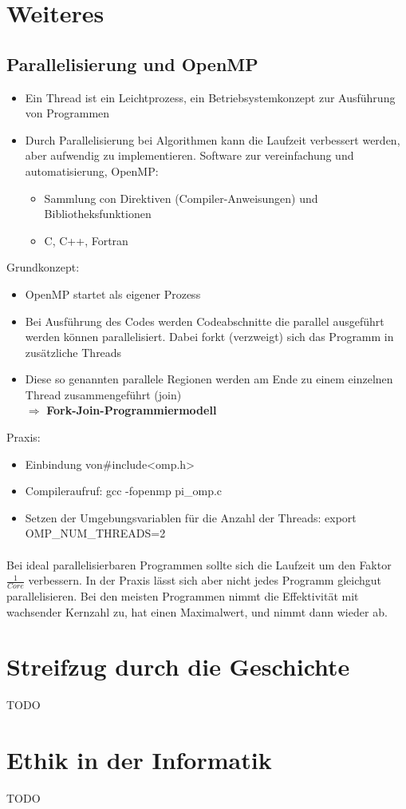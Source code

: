 \newpage
\section{Weiteres}
	\subsection{Parallelisierung und OpenMP}
		\begin{itemize}
			\item Ein Thread ist ein Leichtprozess, ein Betriebsystemkonzept zur Ausführung von Programmen
			\item Durch Parallelisierung bei Algorithmen kann die Laufzeit verbessert werden,
				aber aufwendig zu implementieren. Software zur vereinfachung und automatisierung, OpenMP:
			\begin{itemize}
				\item Sammlung con Direktiven (Compiler-Anweisungen) und Bibliotheksfunktionen
				\item C, C++, Fortran \\
			\end{itemize}
		\end{itemize} 

		Grundkonzept:
		\begin{itemize}
			\item OpenMP startet als eigener Prozess
			\item Bei Ausführung des Codes werden Codeabschnitte die parallel ausgeführt werden können
				parallelisiert. Dabei forkt (verzweigt) sich das Programm in zusätzliche Threads
			\item Diese so genannten parallele Regionen werden am Ende zu einem einzelnen Thread
				zusammengeführt (join) \\
				$\Longrightarrow$ \textbf{Fork-Join-Programmiermodell} \\
		\end{itemize}

		Praxis:
		\begin{itemize}
			\item Einbindung von\#include<omp.h>
			\item Compileraufruf: gcc -fopenmp pi\_omp.c
			\item Setzen der Umgebungsvariablen für die Anzahl der Threads: export OMP\_NUM\_THREADS=2
		\end{itemize}

		\paragraph{} Bei ideal parallelisierbaren Programmen sollte sich die Laufzeit um den Faktor
		$\frac{1}{Core}$ verbessern. In der Praxis lässt sich aber nicht jedes Programm gleichgut 
		parallelisieren. Bei den meisten Programmen nimmt die Effektivität mit wachsender Kernzahl
		zu, hat einen Maximalwert, und nimmt dann wieder ab.



\newpage
\section{Streifzug durch die Geschichte}
TODO

\vspace{1cm}
\section{Ethik in der Informatik}
TODO


